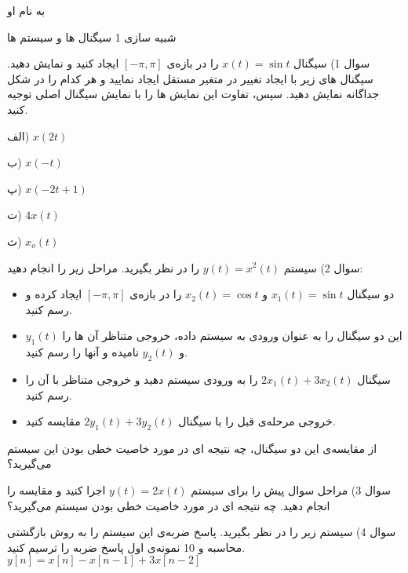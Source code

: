 \documentclass{article}
\begin{document}
\begin{center}
\large
به نام او

شبیه سازی 1 سیگنال ها و سیستم ها

\hrulefill
\end{center}
\large

سوال 1) سیگنال 
$
x(t)=\sin t
$
را در بازه‌ی 
$
[-\pi,\pi]
$
ایجاد کنید و نمایش دهید. سیگنال های زیر با ایجاد تغییر در متغیر مستقل ایجاد نمایید و هر کدام را در شکل جداگانه نمایش دهید. سپس، تفاوت این نمایش ها را با نمایش سیگنال اصلی توجیه کنید.

الف) 
$
x(2t)
$

ب)
$
x(-t)
$

پ)
$
x(-2t+1)
$

ت)
$
4x(t)
$

ث)
$
x_o(t)
$

سوال 2) سیستم 
$
y(t)=x^2(t)
$
را در نظر بگیرید. مراحل زیر را انجام دهید:
\begin{itemize}
\item
 دو سیگنال 
$
x_1(t)=\sin t
$
و
$
x_2(t)=\cos t
$
را در بازه‌ی 
$
[-\pi,\pi]
$
ایجاد کرده و رسم کنید.
\item
این دو سیگنال را به عنوان ورودی به سیستم داده، خروجی متناظر آن ها را 
$
y_1(t)
$
و 
$
y_2(t)
$
نامیده و آنها را رسم کنید. 
\item
سیگنال 
$
2x_1(t)+3x_2(t)
$
را به ورودی سیستم دهید و خروجی متناظر با آن را رسم کنید.
\item
خروجی مرحله‌ی قبل را با سیگنال
$
2y_1(t)+3y_2(t)
$
مقایسه کنید.
\end{itemize}
از مقایسه‌ی این دو سیگنال، چه نتیجه ای در مورد خاصیت خطی بودن این سیستم می‌گیرید؟

سوال 3) مراحل سوال پیش را برای سیستم
$
y(t)=2x(t)
$
اجرا کنید و مقایسه را انجام دهید. چه نتیجه ای در مورد خاصیت خطی بودن سیستم می‌گیرید؟

سوال 4) سیستم زیر را در نظر بگیرید. پاسخ ضربه‌ی این سیستم را به روش بازگشتی محاسبه و 10 نمونه‌ی اول پاسخ ضربه را ترسیم کنید.
$
y[n]=x[n]-x[n-1]+3x[n-2]
$
\end{document}
